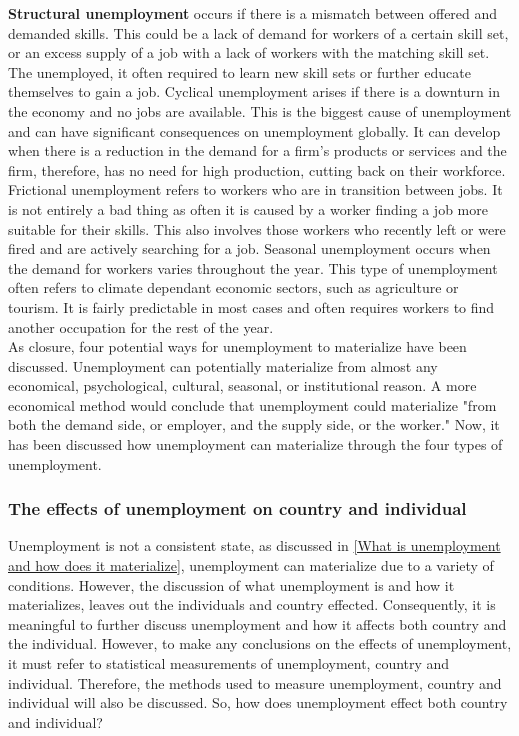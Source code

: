 \textbf{Structural unemployment} occurs if there is a mismatch between offered and demanded skills.
This could be a lack of demand for workers of a certain skill set, or an excess supply of a job with a lack of workers with the matching skill set.
The unemployed, it often required to learn new skill sets or further educate themselves to gain a job.
Cyclical unemployment arises if there is a downturn in the economy and no jobs are available.
This is the biggest cause of unemployment and can have significant consequences on unemployment globally. \cite{Understanding_four_types_of_unemployment}
It can develop when there is a reduction in the demand for a firm's products or services and the firm, therefore, has no need for high production, cutting back on their workforce. 
Frictional unemployment refers to workers who are in transition between jobs. 
It is not entirely a bad thing as often it is caused by a worker finding a job more suitable for their skills.
This also involves those workers who recently left or were fired and are actively searching for a job.
Seasonal unemployment occurs when the demand for workers varies throughout the year.
This type of unemployment often refers to climate dependant economic sectors, such as agriculture or tourism.
It is fairly predictable in most cases and often requires workers to find another occupation for the rest of the year. \\

As closure, four potential ways for unemployment to materialize have been discussed.
Unemployment can potentially materialize from almost any economical, psychological, cultural, seasonal, or institutional reason. 
A more economical method would conclude that unemployment could materialize "from both the demand side, or employer, and the supply side, or the worker." \cite{Economical_theory_behind_unemployment}
Now, it has been discussed how unemployment can materialize through the four types of unemployment. \cite{Guide_to_unemployment} \\

\subsubsection{The effects of unemployment on country and individual}
Unemployment is not a consistent state, as discussed in \ref{What is unemployment and how does it materialize}, unemployment can materialize due to a variety of conditions.
However, the discussion of what unemployment is and how it materializes, leaves out the individuals and country effected.
Consequently, it is meaningful to further discuss unemployment and how it affects both country and the individual.
However, to make any conclusions on the effects of unemployment, it must refer to statistical measurements of unemployment, country and individual. 
Therefore, the methods used to measure unemployment, country and individual will also be discussed.
So, how does unemployment effect both country and individual? \\

